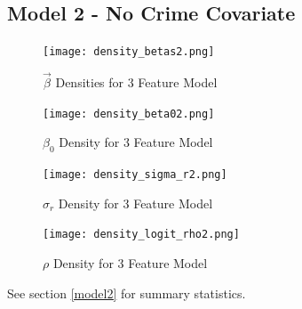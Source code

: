 \documentclass[11pt]{article}
\begin{document}
\subsection{Model 2 - No Crime Covariate}


\begin{figure}[h!] 
	\centering
  \texttt{[image: density\_betas2.png]}
  \caption{$\vec{\beta}$ Densities for 3 Feature Model}
  \label{fig:dbetas2}
\end{figure}

\begin{figure}[h!] 
	\centering
  \texttt{[image: density\_beta02.png]}
  \caption{$\beta_0$ Density for 3 Feature Model}
  \label{fig:dbeta02}
\end{figure}

\begin{figure}[h!] 
	\centering
  \texttt{[image: density\_sigma\_r2.png]}
  \caption{$\sigma_r$ Density for 3 Feature Model}
  \label{fig:dsigma_r2}
\end{figure}

\begin{figure}[h!] 
	\centering
  \texttt{[image: density\_logit\_rho2.png]}
  \caption{$\rho$ Density for 3 Feature Model}
  \label{fig:dlogit_rho2}
\end{figure}

\FloatBarrier

See section \ref{model2} for summary statistics.
\end{document}
